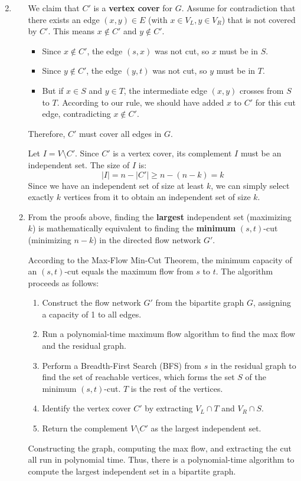 \documentclass[12pt,a4paper]{article}
\makeatletter
\newtheorem*{solution}{Solution}
\theoremstyle{definition}
\renewenvironment{solution}[1][Solution] {\par\pushQED{\qed}\normalfont\topsep6\p@\@plus6\p@\relax\trivlist\item[\hskip\labelsep\bfseries#1\@addpunct{.}]\ignorespaces}{\popQED\endtrivlist\@endpefalse} \makeatother
\makeatother
\begin{document}
\begin{enumerate}
\begin{solution}
\begin{enumerate}
    We claim that $C'$ is a \textbf{vertex cover} for $G$. Assume for contradiction that there exists an edge $(x, y) \in E$ (with $x \in V_L, y \in V_R$) that is not covered by $C'$. This means $x \notin C'$ and $y \notin C'$.
    \begin{itemize}
        \item Since $x \notin C'$, the edge $(s, x)$ was not cut, so $x$ must be in $S$.
        \item Since $y \notin C'$, the edge $(y, t)$ was not cut, so $y$ must be in $T$.
        \item But if $x \in S$ and $y \in T$, the intermediate edge $(x, y)$ crosses from $S$ to $T$. According to our rule, we should have added $x$ to $C'$ for this cut edge, contradicting $x \notin C'$.
    \end{itemize}
    Therefore, $C'$ must cover all edges in $G$. 
    
    Let $I = V \setminus C'$. Since $C'$ is a vertex cover, its complement $I$ must be an independent set. The size of $I$ is:
    $$|I| = n - |C'| \ge n - (n - k) = k$$
    Since we have an independent set of size at least $k$, we can simply select exactly $k$ vertices from it to obtain an independent set of size $k$.

    \item   
    From the proofs above, finding the \textbf{largest} independent set (maximizing $k$) is mathematically equivalent to finding the \textbf{minimum} $(s, t)$-cut (minimizing $n - k$) in the directed flow network $G'$.
    
    According to the Max-Flow Min-Cut Theorem, the minimum capacity of an $(s, t)$-cut equals the maximum flow from $s$ to $t$. The algorithm proceeds as follows:
    \begin{enumerate}
        \item Construct the flow network $G'$ from the bipartite graph $G$, assigning a capacity of 1 to all edges.
        \item Run a polynomial-time maximum flow algorithm to find the max flow and the residual graph.
        \item Perform a Breadth-First Search (BFS) from $s$ in the residual graph to find the set of reachable vertices, which forms the set $S$ of the minimum $(s, t)$-cut. $T$ is the rest of the vertices.
        \item Identify the vertex cover $C'$ by extracting $V_L \cap T$ and $V_R \cap S$.
        \item Return the complement $V \setminus C'$ as the largest independent set.
    \end{enumerate}
    Constructing the graph, computing the max flow, and extracting the cut all run in polynomial time. Thus, there is a polynomial-time algorithm to compute the largest independent set in a bipartite graph.
    
\end{enumerate}
    \end{solution}
    
\end{enumerate}

\end{document}
